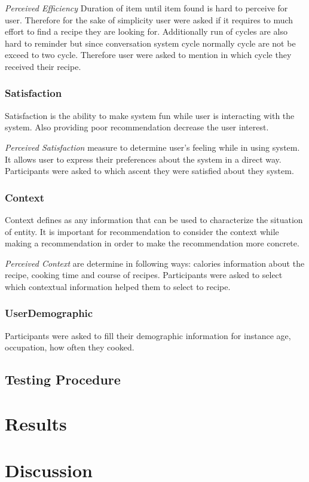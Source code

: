 \textit{Perceived Efficiency} Duration of item until item found is hard to perceive for user. Therefore for the sake of simplicity user were asked if it requires to much effort to find a recipe they are looking for. Additionally run of cycles are also hard to reminder but since conversation system cycle normally cycle are not be exceed to two cycle. Therefore user were asked to mention in which cycle they received their recipe. 

\subsubsection{Satisfaction}

Satisfaction is the ability to make system fun while user is interacting with the system. Also providing poor recommendation decrease the user interest.\newline

\textit{Perceived Satisfaction} measure to determine user’s feeling while in using system. It allows user to express their preferences about the system in a direct way. Participants were asked to which ascent they were satisfied about they system.

\subsubsection{Context}

Context defines as any information that can be used to characterize the situation of entity. It is important for recommendation to consider the context while making a recommendation in order to make the recommendation more concrete. \newline

\textit{Perceived Context} are determine in following ways: calories information about the recipe,  cooking time and course of recipes. Participants were asked to select which contextual information helped them to select to recipe. 

\subsubsection{UserDemographic}

Participants were asked to fill their demographic information for instance age, occupation, how often they cooked. 

\subsection {Testing Procedure}

\section{Results}

\section{Discussion}
